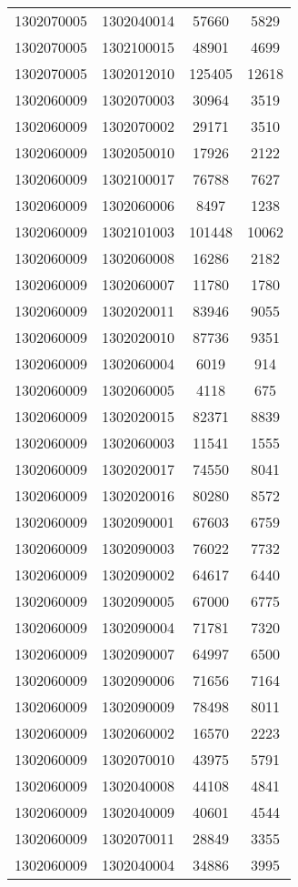\begin{longtable}{llcc}
1302070005 & 1302040014 & 57660 & 5829\\
1302070005 & 1302100015 & 48901 & 4699\\
1302070005 & 1302012010 & 125405 & 12618\\
1302060009 & 1302070003 & 30964 & 3519\\
1302060009 & 1302070002 & 29171 & 3510\\
1302060009 & 1302050010 & 17926 & 2122\\
1302060009 & 1302100017 & 76788 & 7627\\
1302060009 & 1302060006 & 8497 & 1238\\
1302060009 & 1302101003 & 101448 & 10062\\
1302060009 & 1302060008 & 16286 & 2182\\
1302060009 & 1302060007 & 11780 & 1780\\
1302060009 & 1302020011 & 83946 & 9055\\
1302060009 & 1302020010 & 87736 & 9351\\
1302060009 & 1302060004 & 6019 & 914\\
1302060009 & 1302060005 & 4118 & 675\\
1302060009 & 1302020015 & 82371 & 8839\\
1302060009 & 1302060003 & 11541 & 1555\\
1302060009 & 1302020017 & 74550 & 8041\\
1302060009 & 1302020016 & 80280 & 8572\\
1302060009 & 1302090001 & 67603 & 6759\\
1302060009 & 1302090003 & 76022 & 7732\\
1302060009 & 1302090002 & 64617 & 6440\\
1302060009 & 1302090005 & 67000 & 6775\\
1302060009 & 1302090004 & 71781 & 7320\\
1302060009 & 1302090007 & 64997 & 6500\\
1302060009 & 1302090006 & 71656 & 7164\\
1302060009 & 1302090009 & 78498 & 8011\\
1302060009 & 1302060002 & 16570 & 2223\\
1302060009 & 1302070010 & 43975 & 5791\\
1302060009 & 1302040008 & 44108 & 4841\\
1302060009 & 1302040009 & 40601 & 4544\\
1302060009 & 1302070011 & 28849 & 3355\\
1302060009 & 1302040004 & 34886 & 3995\\

\end{longtable}
